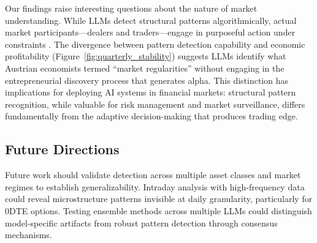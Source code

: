 Our findings raise interesting questions about the nature of market understanding. While LLMs detect structural patterns algorithmically, actual market participants—dealers and traders—engage in purposeful action under constraints \cite{mises1949,rothbard1962}. The divergence between pattern detection capability and economic profitability (Figure~\ref{fig:quarterly_stability}) suggests LLMs identify what Austrian economists termed ``market regularities'' \cite{mises1949,rothbard1962} without engaging in the entrepreneurial discovery process that generates alpha. This distinction has implications for deploying AI systems in financial markets: structural pattern recognition, while valuable for risk management and market surveillance, differs fundamentally from the adaptive decision-making that produces trading edge.

\subsection{Future Directions}
Future work should validate detection across multiple asset classes and market regimes to establish generalizability. Intraday analysis with high-frequency data could reveal microstructure patterns invisible at daily granularity, particularly for 0DTE options. Testing ensemble methods across multiple LLMs could distinguish model-specific artifacts from robust pattern detection through consensus mechanisms.